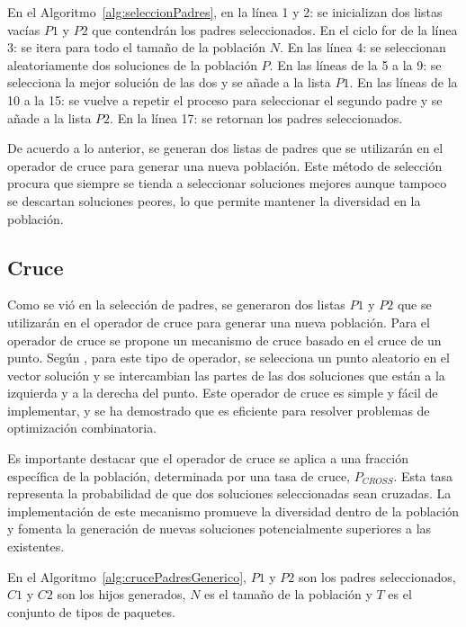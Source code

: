 \documentclass[openany]{article}
\begin{document}
En el Algoritmo~\ref{alg:seleccionPadres}, en la línea 1 y 2: se inicializan dos listas vacías $P1$ y $P2$ que contendrán los padres seleccionados. En el ciclo for de la línea 3: se itera para todo el tamaño de la población $N$. En las línea 4: se seleccionan aleatoriamente dos soluciones de la población $P$. En las líneas de la 5 a la 9: se selecciona la mejor solución de las dos y se añade a la lista $P1$. En las líneas de la 10 a la 15: se vuelve a repetir el proceso para seleccionar el segundo padre y se añade a la lista $P2$. En la línea 17: se retornan los padres seleccionados.

De acuerdo a lo anterior, se generan dos listas de padres que se utilizarán en el operador de cruce para generar una nueva población. Este método de selección procura que siempre se tienda a seleccionar soluciones mejores aunque tampoco se descartan soluciones peores, lo que permite mantener la diversidad en la población.

\subsection{Cruce}

Como se vió en la selección de padres, se generaron dos listas $P1$ y $P2$ que se utilizarán en el operador de cruce para generar una nueva población. Para el operador de cruce se propone un mecanismo de cruce basado en el cruce de un punto. Según \textcite{Umbarkar2015}, para este tipo de operador, se selecciona un punto aleatorio en el vector solución y se intercambian las partes de las dos soluciones que están a la izquierda y a la derecha del punto. Este operador de cruce es simple y fácil de implementar, y se ha demostrado que es eficiente para resolver problemas de optimización combinatoria.

Es importante destacar que el operador de cruce se aplica a una fracción específica de la población, determinada por una tasa de cruce, $P_{CROSS}$. Esta tasa representa la probabilidad de que dos soluciones seleccionadas sean cruzadas. La implementación de este mecanismo promueve la diversidad dentro de la población y fomenta la generación de nuevas soluciones potencialmente superiores a las existentes.

En el Algoritmo~\ref{alg:crucePadresGenerico}, $P1$ y $P2$ son los padres seleccionados, $C1$ y $C2$ son los hijos generados, $N$ es el tamaño de la población y $T$ es el conjunto de tipos de paquetes.
\end{document}
